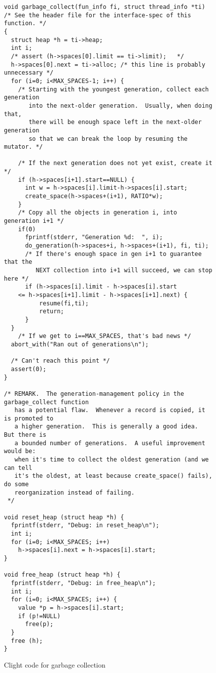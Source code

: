 \begin{figure}[t]
\begin{lstlisting}
void garbage_collect(fun_info fi, struct thread_info *ti)
/* See the header file for the interface-spec of this function. */
{
  struct heap *h = ti->heap;
  int i;
  /* assert (h->spaces[0].limit == ti->limit);   */
  h->spaces[0].next = ti->alloc; /* this line is probably unnecessary */
  for (i=0; i<MAX_SPACES-1; i++) {
    /* Starting with the youngest generation, collect each generation
       into the next-older generation.  Usually, when doing that,
       there will be enough space left in the next-older generation
       so that we can break the loop by resuming the mutator. */

    /* If the next generation does not yet exist, create it */
    if (h->spaces[i+1].start==NULL) {
      int w = h->spaces[i].limit-h->spaces[i].start;
      create_space(h->spaces+(i+1), RATIO*w);
    }
    /* Copy all the objects in generation i, into generation i+1 */
    if(0)
      fprintf(stderr, "Generation %d:  ", i);
      do_generation(h->spaces+i, h->spaces+(i+1), fi, ti);
      /* If there's enough space in gen i+1 to guarantee that the
         NEXT collection into i+1 will succeed, we can stop here */
      if (h->spaces[i].limit - h->spaces[i].start
    <= h->spaces[i+1].limit - h->spaces[i+1].next) {
          resume(fi,ti);
          return;
      }
  }
    /* If we get to i==MAX_SPACES, that's bad news */
  abort_with("Ran out of generations\n");

  /* Can't reach this point */
  assert(0);
}

/* REMARK.  The generation-management policy in the garbage_collect function
   has a potential flaw.  Whenever a record is copied, it is promoted to
   a higher generation.  This is generally a good idea.  But there is
   a bounded number of generations.  A useful improvement would be:
   when it's time to collect the oldest generation (and we can tell
   it's the oldest, at least because create_space() fails), do some
   reorganization instead of failing.
 */

void reset_heap (struct heap *h) {
  fprintf(stderr, "Debug: in reset_heap\n");
  int i;
  for (i=0; i<MAX_SPACES; i++)
    h->spaces[i].next = h->spaces[i].start;
}

void free_heap (struct heap *h) {
  fprintf(stderr, "Debug: in free_heap\n");
  int i;
  for (i=0; i<MAX_SPACES; i++) {
    value *p = h->spaces[i].start;
    if (p!=NULL)
      free(p);
  }
  free (h);
}

\end{lstlisting}

\vspace{-0.4em}
\caption{Clight code for garbage collection}
\label{fig:forward}
\vspace{-1em}
\end{figure}